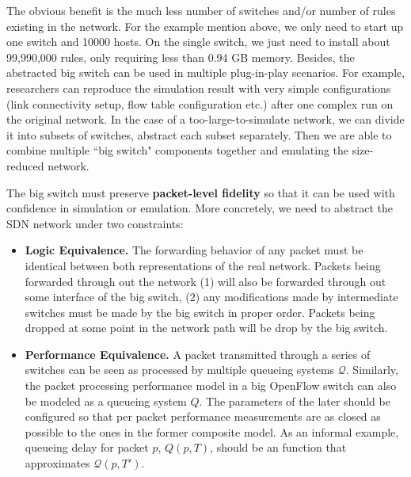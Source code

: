 The obvious benefit is the much less number of switches and/or number of rules existing in the network.
For the example mention above, we only need to start up one switch and 10000 hosts.
On the single switch, we just need to install about 99,990,000 rules, only requiring less than 0.94 GB memory.
Besides, the abstracted big switch can be used in multiple plug-in-play scenarios.
For example, researchers can reproduce the simulation result with very
simple configurations (link connectivity setup, flow table configuration etc.)
after one complex run on the original network.
In the case of a too-large-to-simulate network, we can divide it into subsets of switches,
abstract each subset separately.
Then we are able to combine multiple ``big switch" components together
and emulating the size-reduced network.

The big switch must preserve \textbf{packet-level fidelity} so that
it can be used with confidence in simulation or emulation.
More concretely, we need to abstract the SDN network under two constraints:
\begin{itemize}
\item \textbf{Logic Equivalence.} The forwarding behavior of any packet must be identical
        between both representations of the real network. Packets being
        forwarded through out the network (1) will also be forwarded through out
        some interface of the big switch, (2) any modifications made by
        intermediate switches must be made by the big switch in proper order.
        Packets being dropped at some point in the network path will be drop by the
        big switch.
\item \textbf{Performance Equivalence.} A packet transmitted through a series of
        switches can be seen as processed by multiple queueing systems $\mathcal{Q}$.
        Similarly, the packet processing performance model in a big OpenFlow switch can
        also be modeled as a queueing system $Q$.
        The parameters of the later should be configured so that per packet performance
        measurements are as closed as possible to the ones in the former composite model.
        As an informal example, queueing delay for packet $p$, $Q(p, T)$, should be an
        function that approximates $\mathcal{Q}(p, T')$.
\end{itemize}

